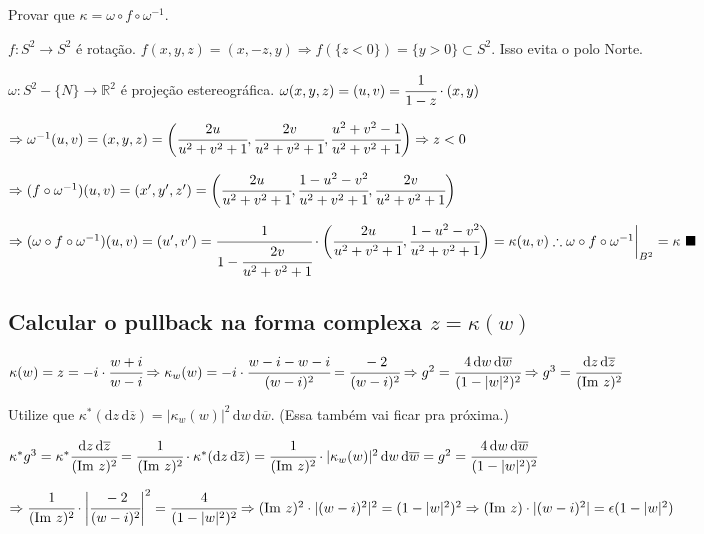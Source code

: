 \documentclass[10pt,a4paper]{article}
\begin{document}
		Provar que $\kappa = \omega \circ f \circ \omega^{-1}$.

		$f : S^2 \rightarrow S^2$ \'e rota\c{c}\~ao. $f(x,y,z) = (x, -z, y) \Rightarrow f(\{z < 0\}) = \{y > 0\} \subset S^2$. Isso evita o polo Norte.

		$\omega : S^2 - \{ N \} \rightarrow \mathbb{R}^2$ \'e proje\c{c}\~ao estereogr\'afica. $\omega(x,y,z) = (u,v) = \cfrac{1}{1-z} \cdot (x, y)$

		$\Rightarrow \omega^{-1}(u, v) = (x, y, z) = \bigg( \cfrac{2u}{u^2 + v^2 + 1}, \cfrac{2v}{u^2 + v^2 + 1}, \cfrac{u^2 + v^2 - 1}{u^2 + v^2 + 1} \bigg) \Rightarrow z < 0$

		$\Rightarrow (f \circ \omega^{-1})(u, v) = (x', y', z') = \bigg( \cfrac{2u}{u^2 + v^2 + 1}, \cfrac{1 - u^2 - v^2}{u^2 + v^2 + 1}, \cfrac{2v}{u^2 + v^2 + 1} \bigg)$

		$\Rightarrow (\omega \circ f \circ \omega^{-1})(u, v) = (u', v') = \cfrac{1}{1-\cfrac{2v}{u^2 + v^2 + 1}} \cdot \bigg( \cfrac{2u}{u^2 + v^2 + 1}, \cfrac{1 - u^2 - v^2}{u^2 + v^2 + 1} \bigg) = \kappa(u, v) \therefore \omega \circ f \circ \omega^{-1} \bigg\vert_{B^2} = \kappa\,\,\blacksquare$

		\subsection{Calcular o pullback na forma complexa $z = \kappa(w)$}
		\begin{flushright}
		\end{flushright}

		$\kappa(w) = z = -i \cdot \cfrac{w + i}{w - i} \Rightarrow \kappa_w(w) = -i \cdot \cfrac{w - i - w - i}{(w - i)^2}= \cfrac{-2}{(w - i)^2} \Rightarrow g^2 = \cfrac{4\, \mathrm{d}w \, \mathrm{d}\overline{w}}{(1 - \vert w \vert^2)^2} \Rightarrow g^3 = \cfrac{\mathrm{d}z \, \mathrm{d}\overline{z}}{(\text{Im } z)^2}$

		Utilize que $\kappa^* (\mathrm{d}z \, \mathrm{d}\overline{z}) = \vert \kappa_w(w) \vert^2 \, \mathrm{d}w \, \mathrm{d}\overline{w}$. (Essa tamb\'em vai ficar pra pr\'oxima.)

		$\kappa^* g^3 = \kappa^* \cfrac{\mathrm{d}z \, \mathrm{d}\overline{z}}{(\text{Im } z)^2} = \cfrac{1}{(\text{Im } z)^2} \cdot \kappa^* (\mathrm{d}z \, \mathrm{d}\overline{z}) = \cfrac{1}{(\text{Im } z)^2} \cdot \vert \kappa_w(w) \vert^2 \, \mathrm{d}w \, \mathrm{d}\overline{w} = g^2 = \cfrac{4\, \mathrm{d}w \, \mathrm{d}\overline{w}}{(1 - \vert w \vert^2)^2}$

		$\Rightarrow \cfrac{1}{(\text{Im } z)^2} \cdot \bigg\vert \cfrac{-2}{(w - i)^2} \bigg\vert^2 = \cfrac{4}{(1 - \vert w \vert^2)^2} \Rightarrow (\text{Im } z)^2 \cdot \vert (w - i)^2 \vert^2 = (1 - \vert w \vert^2)^2 \Rightarrow (\text{Im } z) \cdot \vert (w - i)^2 \vert = \epsilon (1 - \vert w \vert^2)$
\end{document}
